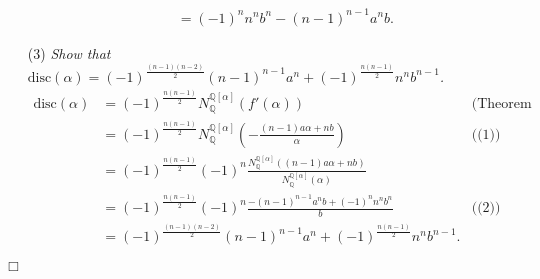 \documentclass{article}
\begin{document}
\begin{enumerate}
\begin{enumerate}
\begin{align*}
  &= (-1)^n n^n b^n - (n-1)^{n-1} a^n b.
  \end{align*}
  \end{enumerate}
\item[(3)]
\emph{Show that $\text{disc}(\alpha) = (-1)^{\frac{(n-1)(n-2)}{2}} (n-1)^{n-1}a^n
  + (-1)^{\frac{n(n-1)}{2}} n^n b^{n-1}$.}
\begin{align*}
\text{disc}(\alpha)
&= (-1)^{\frac{n(n-1)}{2}} N_{\mathbb{Q}}^{\mathbb{Q}[\alpha]}(f'(\alpha))
  &\text{(Theorem 2.8)} \\
&= (-1)^{\frac{n(n-1)}{2}} N_{\mathbb{Q}}^{\mathbb{Q}[\alpha]}
  \left( -\frac{(n-1)a\alpha+nb}{\alpha} \right)
  &\text{((1))} \\
&= (-1)^{\frac{n(n-1)}{2}}(-1)^n
  \frac{N_{\mathbb{Q}}^{\mathbb{Q}[\alpha]}((n-1)a\alpha+nb)}
  {N_{\mathbb{Q}}^{\mathbb{Q}[\alpha]}(\alpha)} \\
&= (-1)^{\frac{n(n-1)}{2}}(-1)^n \frac{-(n-1)^{n-1}a^nb+(-1)^n n^n b^n}{b}
  &\text{((2))} \\
&= (-1)^{\frac{(n-1)(n-2)}{2}} (n-1)^{n-1}a^n
  + (-1)^{\frac{n(n-1)}{2}} n^n b^{n-1}.
\end{align*}
\end{enumerate}
$\Box$ \\\\



\end{document}
